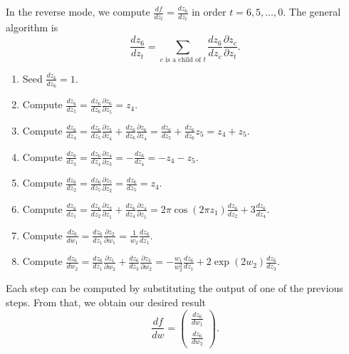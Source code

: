 \documentclass[letterpaper,11pt]{article}
\begin{document}
In the reverse mode, we compute $\frac{df}{dz_t} = \frac{dz_6}{dz_t}$ in order
$t = 6,5,\ldots,0$. The general algorithm is
\begin{equation}
  \frac{dz_6}{dz_t} = \sum_{\text{$c$ is a child of $t$}}
  \frac{dz_6}{dz_c}
  \frac{\partial z_c}{\partial z_t}.
\end{equation}

\begin{enumerate}
\item Seed $\displaystyle \frac{dz_6}{dz_6} = 1$.
\item Compute
  $\displaystyle \frac{dz_6}{dz_5} =
  \frac{dz_6}{dz_6}\frac{\partial z_6}{\partial z_5} = z_4$.
\item Compute
  $\displaystyle \frac{dz_6}{dz_4} = \frac{dz_6}{d z_5}\frac{\partial
    z_5}{\partial z_4} + \frac{d z_6}{d z_6}\frac{\partial z_6}{\partial z_4} =
  \frac{dz_6}{d z_5} + \frac{d z_6}{d z_6}z_5
  =
  z_4 + z_5
  $.
\item Compute
  $\displaystyle \frac{dz_6}{dz_3} = \frac{dz_6}{d z_4}\frac{\partial
    z_4}{\partial z_3} = -\frac{dz_6}{d z_4} = -z_4 - z_5$.
\item Compute
  $\displaystyle \frac{dz_6}{dz_2} = \frac{dz_6}{d z_5}\frac{\partial
    z_5}{\partial z_2} = \frac{dz_6}{d z_5} = z_4$.
\item Compute
  $\displaystyle \frac{dz_6}{dz_1} =
  \frac{dz_6}{d z_2}\frac{\partial  z_2}{\partial z_1} +
  \frac{dz_6}{d z_4}\frac{\partial  z_4}{\partial z_1} =
  2\pi\cos\left(2\pi z_1\right)\frac{dz_6}{d z_2} +
  3\frac{dz_6}{d z_4}$.
\item Compute
  $\displaystyle
  \frac{dz_6}{dw_1} = \frac{dz_6}{dz_1}\frac{\partial z_2}{\partial w_1}
  = \frac{1}{w_2}\frac{dz_6}{dz_1}$.
\item Compute
  $\displaystyle
  \frac{dz_6}{dw_2} = \frac{dz_6}{dz_1}\frac{\partial z_1}{\partial w_2} +
  \frac{dz_6}{dz_3}\frac{\partial z_3}{\partial w_2}
  = -\frac{w_1}{w_2^2}\frac{dz_6}{dz_1} + 2\exp\left(2w_2\right)\frac{dz_6}{dz_3}$.
\end{enumerate}

Each step can be computed by substituting the output of one of the previous
steps. From that, we obtain our desired result
\begin{equation}
  \boxed{
    \frac{df}{dw} = \begin{pmatrix}
      \frac{dz_6}{dw_1} \\ \frac{dz_6}{dw_2}
    \end{pmatrix}.
  }
\end{equation}
\end{document}
